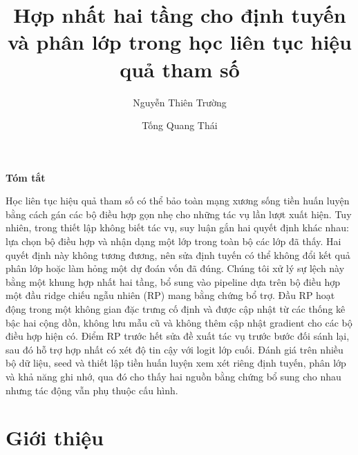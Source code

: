 \documentclass[runningheads]{llncs}
\renewenvironment{abstract}{%
  \par\addvspace{.35cm}%
  \begin{center}\large\bfseries\abstractname\end{center}%
  \vspace{-.5em}%
  \list{}{\small
    \setlength{\leftmargin}{1cm}%
    \setlength{\rightmargin}{1cm}%
    \setlength{\labelwidth}{0pt}%
    \setlength{\listparindent}{0pt}%
    \setlength{\itemindent}{0pt}%
    \setlength{\topsep}{0pt}%
    \setlength{\partopsep}{0pt}%
    \setlength{\parsep}{0pt}%
    \setlength{\itemsep}{0pt}}%
  \item\relax
}{\endlist}
\begin{document}
%
\renewcommand{\andname}{và}
\renewcommand{\abstractname}{Tóm tắt}
\renewcommand{\keywordname}{{\bf Từ khóa:}}
\renewcommand{\figurename}{Hình}
\renewcommand{\tablename}{Bảng}
\renewcommand{\refname}{Tài liệu tham khảo}
\renewcommand{\proofname}{Chứng minh}
\renewcommand{\ackname}{Lời cảm ơn.}
%
\title{Hợp nhất hai tầng cho định tuyến và phân lớp trong
học liên tục hiệu quả tham số}
%
%
\author{Nguyễn Thiên Trường \and Tống Quang Thái}
%
%
%
\maketitle
\pagestyle{empty}
\thispagestyle{empty}
%
\begin{abstract}
Học liên tục hiệu quả tham số có thể bảo toàn mạng xương sống tiền huấn luyện
bằng cách gán các bộ điều hợp gọn nhẹ cho những tác vụ lần lượt xuất hiện. Tuy
nhiên, trong thiết lập không biết tác vụ, suy luận gắn hai quyết định khác nhau:
lựa chọn bộ điều hợp và nhận dạng một lớp trong toàn bộ các lớp đã thấy. Hai
quyết định này không tương đương, nên sửa định tuyến có thể không đổi kết quả
phân lớp hoặc làm hỏng một dự đoán vốn đã đúng. Chúng tôi xử lý sự lệch này bằng
một khung hợp nhất hai tầng, bổ sung vào pipeline dựa trên bộ điều hợp một đầu
ridge chiếu ngẫu nhiên (RP) mang bằng chứng bổ trợ. Đầu RP hoạt động trong một
không gian đặc trưng cố định và được cập nhật từ các thống kê bậc hai cộng dồn,
không lưu mẫu cũ và không thêm cập nhật gradient cho các bộ điều hợp hiện có.
Điểm RP trước hết sửa đề xuất tác vụ trước bước đối sánh lại, sau đó hỗ trợ hợp
nhất có xét độ tin cậy với logit lớp cuối. Đánh giá trên nhiều bộ dữ liệu, seed
và thiết lập tiền huấn luyện xem xét riêng định tuyến, phân lớp và khả năng ghi
nhớ, qua đó cho thấy hai nguồn bằng chứng bổ sung cho nhau nhưng tác động vẫn
phụ thuộc cấu hình.

\end{abstract}
%
%
%
\section{Giới thiệu}
\end{document}
